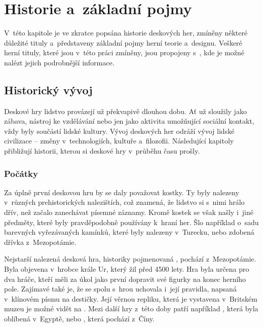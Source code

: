 \chapter{Historie a~základní pojmy}
\label{chap:theory}

V~této kapitole je ve zkratce popsána historie deskových her, zmíněny některé důležité tituly a~představeny základní pojmy herní teorie a~designu. Veškeré herní tituly, které jsou v~této práci zmíněny, jsou propojeny s~, kde je možné nalézt jejich podrobnější informace.


\section{Historický vývoj}
\label{sec:history}

Deskové hry lidstvo provázejí už překvapivě dlouhou dobu. Ať už sloužily jako zábava, nástroj ke vzdělávání nebo jen jako aktivita umožňující sociální kontakt, vždy byly součástí lidské kultury. Vývoj deskových her odráží vývoj lidské civilizace -- změny v~technologiích, kultuře a~filozofii. Následující kapitoly přibližují historii, kterou si deskové hry v~průběhu času prošly.

\subsection{Počátky}
\label{subsec:beginnings}

Za úplně první deskovou hru by se daly považovat kostky. Ty byly nalezeny v~různých prehistorických nalezištích, což znamená, že lidstvo si s~nimi hrálo dřív, než začalo zanechávat písemné záznamy. Kromě kostek se však našly i~jiné předměty, které byly pravděpodobně používány k~hraní her. Šlo například o~sadu barevných vyřezávaných kamínků, které byly nalezeny v~Turecku, nebo zdobená dřívka z~Mezopotámie. \cite{attia_2018}

Nejstarší nalezená desková hra, historiky pojmenovaná , pochází z~Mezopotámie. Byla objevena v~hrobce krále Ur, který žil před 4500 lety. Hra byla určena pro dva hráče, kteří měli za úkol jako první dopravit své figurky na konec herního pole. Zajímavé také je, že se spolu s~hrou uchovala i~její pravidla, napsaná v~klínovém písmu na destičky. Její věrnou repliku, která je vystavena v~Britském muzeu je možné vidět na . Mezi další hry z~této doby patří například , která byla oblíbená v~Egyptě, nebo , která pochází z~Číny. \cite{british_museum_2021}


